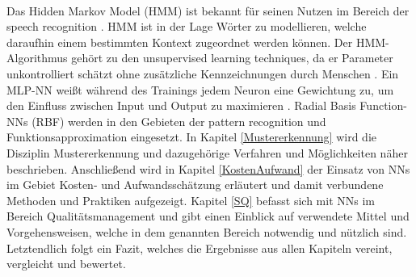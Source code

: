 \\
Das Hidden Markov Model (HMM) ist bekannt für seinen Nutzen im Bereich der speech recognition \cite{residualnn}. HMM ist in der Lage Wörter zu modellieren, welche daraufhin einem bestimmten Kontext zugeordnet werden können. Der HMM-Algorithmus gehört zu den unsupervised learning techniques, da er Parameter unkontrolliert schätzt ohne zusätzliche Kennzeichnungen durch Menschen \cite{hmm}. Ein MLP-NN weißt während des Trainings jedem Neuron eine Gewichtung zu, um den Einfluss zwischen Input und Output zu maximieren \cite{Khalifelu2012}. Radial Basis Function-NNs (RBF) werden in den Gebieten der pattern recognition und Funktionsapproximation eingesetzt. In Kapitel \ref{Mustererkennung} wird die Disziplin Mustererkennung und dazugehörige Verfahren und Möglichkeiten näher beschrieben. Anschließend wird in Kapitel \ref{KostenAufwand} der Einsatz von NNs im Gebiet Kosten- und Aufwandsschätzung erläutert und damit verbundene Methoden und Praktiken aufgezeigt. Kapitel \ref{SQ} befasst sich mit NNs im Bereich Qualitätsmanagement und gibt einen Einblick auf verwendete Mittel und Vorgehensweisen, welche in dem genannten Bereich notwendig und nützlich sind. Letztendlich folgt ein Fazit, welches die Ergebnisse aus allen Kapiteln vereint, vergleicht und bewertet.
